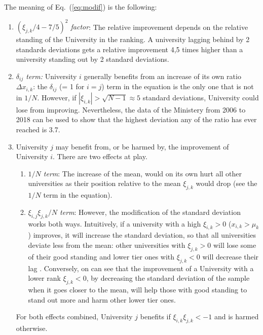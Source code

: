 \documentclass[twocolumn]{article}
\def\eqref#1{Eq.~(\ref{eq:#1})}
\begin{document}
The meaning of \eqref{modif} is the following:
\begin{enumerate}
    \item \emph{$(\xi_{j,k}/4 - 7/5)^2$ factor}:  The relative improvement depends on the relative standing of the University in the ranking.  A university lagging behind by 2 standards deviations gets a relative improvement 4,5 times higher than a university standing out by 2 standard deviations.
    \item \emph{$\delta_{ij}$ term:} University $i$ generally benefits from an increase of its own ratio $\Delta x_{i,k}$: the $\delta_{ij}$ (= 1 for $i = j$) term in the equation is the only one that is not in $1/N$. However, if $|\xi_{i,k}| > \sqrt{N - 1} \approx 5$ standard deviations, University could lose from improving.  Nevertheless, the data of the Ministery from 2006 to 2018 can be used to show that the highest deviation any of the ratio has ever reached is 3.7.
    \item University $j$ may benefit from, or be harmed by, the improvement of University $i$.  There are two effects at play.  
    \begin{enumerate}
    \item \emph{$1/N$ term}: The increase of the mean, would on its own hurt all other universities as their position relative to the mean $\xi_{j,k}$ would drop (see the $1/N$ term in the equation).  
    \item \emph{$\xi_{i,j}\xi_{j,k}/N$ term}: However, the modification of the standard deviation works both ways. Intuitively, if a university with a high $\xi_{i,k} > 0$ ($x_{i,k} > \mu_k$) improves, it will increase the standard deviation, so that all universities deviate less from the mean: other universities with $\xi_{j,k} > 0$ will lose some of their good standing and lower tier ones with $\xi_{j,k} < 0$ will decrease their lag . Conversely, on can see that the improvement of a University with a lower rank $\xi_{j,k} < 0$, by decreasing the standard deviation of the sample when it goes closer to the mean, will help those with good standing to stand out more and harm other lower tier ones. 
\end{enumerate}
    For both effects combined, University $j$ benefits if $\xi_{i,k}\xi_{j,k} < -1$ and is harmed otherwise. 
\end{enumerate}
\end{document}
